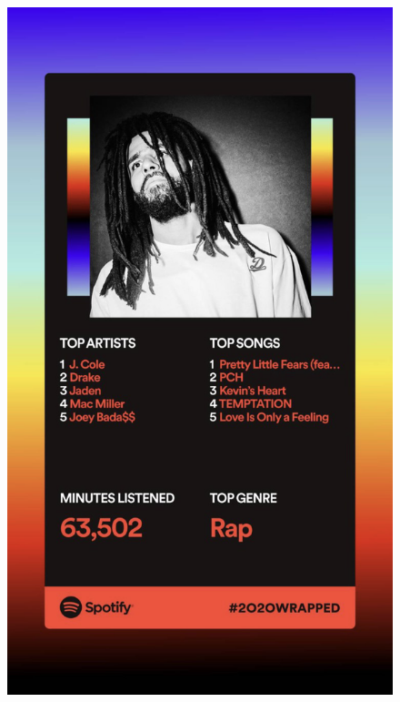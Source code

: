 \documentclass{report}
\begin{document}
\begin{figure}
\begin{minipage}[b]{0.25\textwidth}
    \includegraphics[width=\textwidth]{Imagens/IMG_3810.PNG}
  \end{minipage}
  \hfill
  \begin{minipage}[b]{0.25\textwidth}

\end{minipage}
\end{figure}
\end{document}
